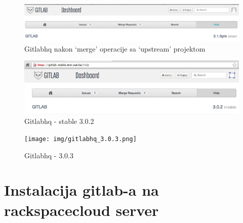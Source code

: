 \begin{figure}[H]
\centering
\includegraphics[width=15cm]{img/gitlab_hernad_310_after_merge.png}
\caption{Gitlabhq nakon `merge' operacije sa `upstream' projektom}
\end{figure}

\begin{figure}[H]
\centering
\includegraphics[width=15cm]{img/gitlab_stable_3.0.2.png}
\caption{Gitlabhq - stable 3.0.2}
\end{figure}


\begin{figure}[H]
\centering
\texttt{[image: img/gitlabhq\_3.0.3.png]}
\caption{Gitlabhq - 3.0.3}
\end{figure}


\chapter{Instalacija gitlab-a na rackspacecloud server}

